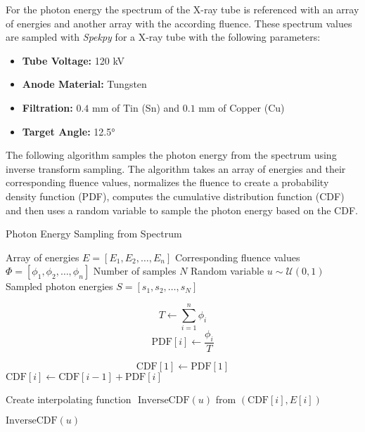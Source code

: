 For the photon energy the spectrum of the X-ray tube is referenced with an array
of energies and another array with the according fluence.
These spectrum values are sampled with \emph{Spekpy} \cite{spekpy,poludniowski2021spekpy} for a X-ray tube with the following parameters:
\begin{itemize}
    \item \textbf{Tube Voltage:} 120 kV
    \item \textbf{Anode Material:} Tungsten
    \item \textbf{Filtration:} $0.4$ \si{\milli\meter} of Tin (Sn) and $0.1$ \si
    {\milli\meter} of Copper (Cu)
    \item \textbf{Target Angle:} 12.5°
\end{itemize}

The following algorithm samples the photon energy from the spectrum using
inverse transform sampling. The algorithm takes an array of energies and their
corresponding fluence values, normalizes the fluence to create a probability
density function (PDF), computes the cumulative distribution function (CDF)
and then uses a random variable to sample the photon energy based on the CDF.

\begin{algorithm}[H]
\caption{Photon Energy Sampling from Spectrum}
\begin{algorithmic}[1]
\Require Array of energies $E = [E_1, E_2, \dots, E_n]$ 
\Require Corresponding fluence values $\Phi = [\phi_1, \phi_2, \dots, \phi_n]$ 
\Require Number of samples $N$ 
\Require Random variable $u \sim \mathcal{U}(0, 1)$ \Ensure Sampled photon
energies $S = [s_1, s_2, \dots, s_N]$

 \State $$T \gets \sum_{i=1}^{n} \phi_i$$
\State $$\text{PDF}[i] \gets \frac{\phi_i}{T}$$

\State $$\text{CDF}[1] \gets \text{PDF}[1]$$ 
\State $\text{CDF}[i] \gets \text{CDF}[i-1] + \text{PDF}[i]$ 
\EndFor


\State Create interpolating function $\text{ InverseCDF}(u)$ from
$(\text{CDF}[i], E[i])$

\State \Return $\text{InverseCDF}(u)$

\end{algorithmic}
\end{algorithm}

